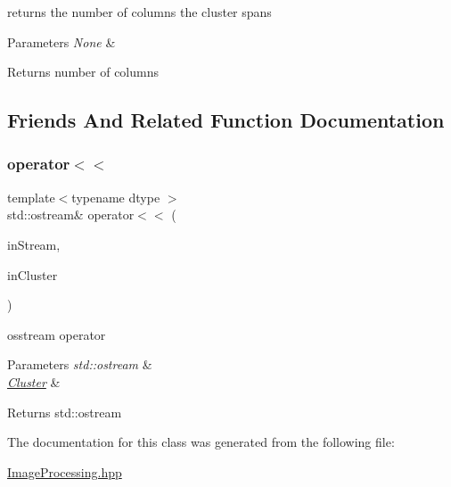 returns the number of columns the cluster spans


\begin{DoxyParams}{Parameters}
{\em None} & \\
\hline
\end{DoxyParams}
\begin{DoxyReturn}{Returns}
number of columns 
\end{DoxyReturn}


\subsection{Friends And Related Function Documentation}
\mbox{\label{class_num_cpp_1_1_image_processing_1_1_cluster_a9b2341014fa476e2540940941d9dcb30}} 
\subsubsection{\texorpdfstring{operator$<$$<$}{operator<<}}
{\footnotesize\ttfamily template$<$typename dtype $>$ \\
std\+::ostream\& operator$<$$<$ (\begin{DoxyParamCaption}\item[{std\+::ostream \&}]{in\+Stream,  }\item[{const \mbox{\hyperlink{class_num_cpp_1_1_image_processing_1_1_cluster}{Cluster}} \&}]{in\+Cluster }\end{DoxyParamCaption})\hspace{0.3cm}{\ttfamily [friend]}}

osstream operator


\begin{DoxyParams}{Parameters}
{\em std\+::ostream} & \\
\hline
{\em \mbox{\hyperlink{class_num_cpp_1_1_image_processing_1_1_cluster}{Cluster}}} & \\
\hline
\end{DoxyParams}
\begin{DoxyReturn}{Returns}
std\+::ostream 
\end{DoxyReturn}


The documentation for this class was generated from the following file\+:\begin{DoxyCompactItemize}
\item 
\mbox{\hyperlink{_image_processing_8hpp}{Image\+Processing.\+hpp}}\end{DoxyCompactItemize}
